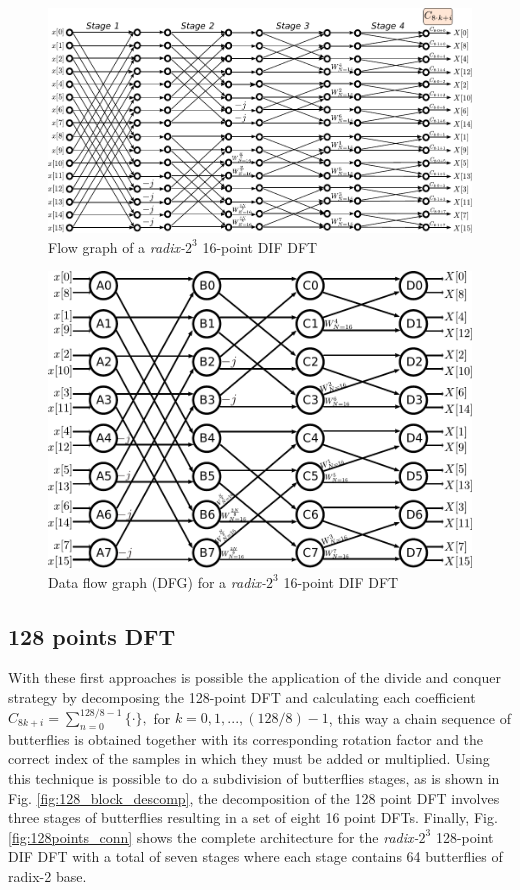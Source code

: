\documentclass[10pt,times,mathptm,psfig,final,journal,comsoc]{IEEEtran}
\begin{document}
\begin{figure} [ht]
	\centering
	\includegraphics[width=\linewidth]{Diagramas/miSeccionFiguras/16PuntosRadix8Conexion.pdf}
	\caption{Flow graph of a \textit{radix-}$2^3$ 16-point DIF DFT}
	\label{fig:16points_df}
\end{figure}

\begin{figure} [ht]
	\centering
	\includegraphics[width=\linewidth]{Diagramas/miSeccionFiguras/16PuntosRadix8Burbujas.pdf}
	\caption{Data flow graph (DFG) for a \textit{radix-}$2^3$ 16-point DIF DFT}
	\label{fig:16points_dfg}
\end{figure}

\subsection{128 points DFT}
With these first approaches is possible the application of the divide and conquer strategy by decomposing the 128-point DFT and calculating each coefficient $C_{8k+i} = \sum_{n=0}^{128/8-1} \{ \cdot \}, $ for $k=0,1,...,(128/8)-1$, this way a  chain sequence of butterflies is obtained together with its corresponding rotation factor and the correct index of the samples in which they must be added or multiplied. Using this technique is possible to do a subdivision of butterflies stages, as is shown in Fig. \ref{fig:128_block_descomp}, the decomposition of the 128 point DFT involves three stages of butterflies resulting in a set of eight 16 point DFTs. Finally, Fig. \ref{fig:128points_conn} shows the complete architecture for the  \textit{radix-}$2^3$ 128-point DIF DFT with a total of seven stages where each stage  contains 64 butterflies of radix-2 base.
\end{document}
